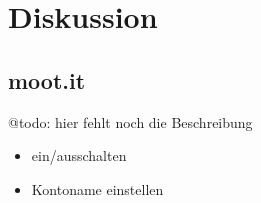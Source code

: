 \label{kap:diskussion}
\chapter{Diskussion}

\label{sec:moot.it}
\section{moot.it}

@todo: hier fehlt noch die Beschreibung

\begin{itemize}
\item ein/ausschalten
\item Kontoname einstellen
\end{itemize}

